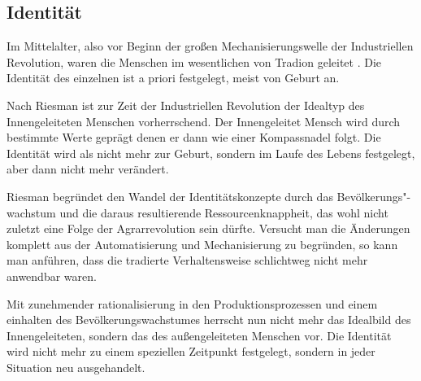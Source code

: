 \subsection{Identität}

Im Mittelalter, also vor Beginn der großen Mechanisierungswelle der Industriellen Revolution, waren die Menschen im wesentlichen von Tradion geleitet \parencite{riessman}.
Die Identität des einzelnen ist a priori festgelegt, meist von Geburt an\parencite{rosa}.

Nach Riesman ist zur Zeit der Industriellen Revolution der Idealtyp des Innengeleiteten Menschen vorherrschend. Der Innengeleitet Mensch wird durch bestimmte Werte geprägt denen er dann wie einer Kompassnadel folgt.
Die Identität wird als nicht mehr zur Geburt, sondern im Laufe des Lebens festgelegt, aber dann nicht mehr verändert.

Riesman begründet den Wandel der Identitätskonzepte durch das Bevölkerungs"-wachstum und die daraus resultierende Ressourcenknappheit, das wohl nicht zuletzt eine Folge der Agrarrevolution sein dürfte.
Versucht man die Änderungen komplett aus der Automatisierung und Mechanisierung zu begründen, so kann man anführen, dass die tradierte Verhaltensweise schlichtweg nicht mehr anwendbar waren. 

Mit zunehmender rationalisierung in den Produktionsprozessen und einem einhalten des Bevölkerungswachstumes herrscht nun nicht mehr das Idealbild des Innengeleiteten, sondern das des außengeleiteten Menschen vor.
Die Identität wird nicht mehr zu einem speziellen Zeitpunkt festgelegt, sondern in jeder Situation neu ausgehandelt.
